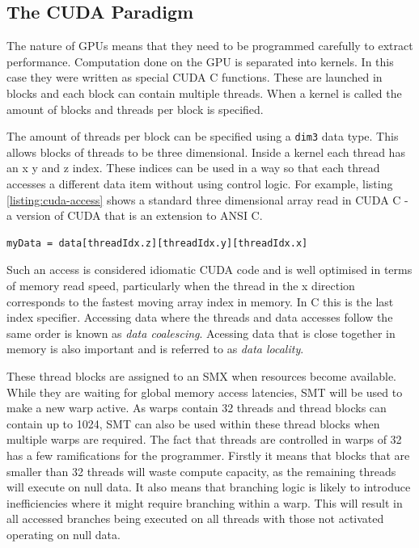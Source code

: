 \documentclass[12pt,a4paper]{report}
\begin{document}
\subsection{The CUDA Paradigm}
\label{subsection:cuda}

The nature of GPUs means that they need to be programmed carefully to extract performance. Computation done on the GPU is separated into kernels. In this case they were written as special CUDA C functions. These are launched in blocks and each block can contain multiple threads. When a kernel is called the amount of blocks and threads per block is specified.

The amount of threads per block can be specified using a \verb|dim3| data type. This allows blocks of threads to be three dimensional. Inside a kernel each thread has an x y and z index. These indices can be used in a way so that each thread accesses a different data item without using control logic. For example, listing \ref{listing:cuda-access} shows a standard three dimensional array read in CUDA C - a version of CUDA that is an extension to ANSI C.

\begin{center}
\begin{minipage}{0.9\textwidth}
\centering
\begin{lstlisting}[frame=single]
myData = data[threadIdx.z][threadIdx.y][threadIdx.x]
\end{lstlisting}
\end{minipage}
\end{center}

Such an access is considered idiomatic CUDA code and is well optimised in terms of memory read speed, particularly when the thread in the x direction corresponds to the fastest moving array index in memory. In C this is the last index specifier. Accessing data where the threads and data accesses follow the same order is known as \textit{data coalescing}. Acessing data that is close together in memory is also important and is referred to as \textit{data locality}.

These thread blocks are assigned to an SMX when resources become available. While they are waiting for global memory access latencies, SMT will be used to make a new warp active. As warps contain \num{32} threads and thread blocks can contain up to \num{1024}, SMT can also be used within these thread blocks when multiple warps are required. The fact that threads are controlled in warps of 32 has a few ramifications for the programmer. Firstly it means that blocks that are smaller than 32 threads will waste compute capacity, as the remaining threads will execute on null data. It also means that branching logic is likely to introduce inefficiencies where it might require branching within a warp. This will result in all accessed branches being executed on all threads with those not activated operating on null data.
\end{document}
